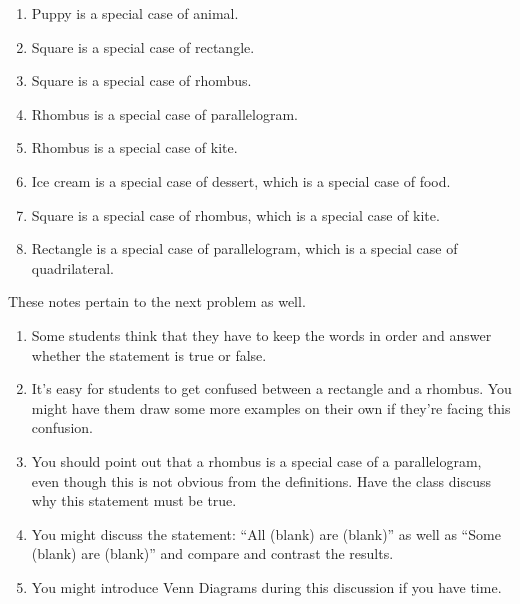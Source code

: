 \documentclass[handout]{ximera}
\begin{document}
\begin{problem}
\begin{solution}
\begin{enumerate}
\item Puppy is a special case of animal.
\item Square is a special case of rectangle.
\item Square is a special case of rhombus.
\item Rhombus is a special case of parallelogram.
\item Rhombus is a special case of kite.
\item Ice cream is a special case of dessert, which is a special case of food.
\item Square is a special case of rhombus, which is a special case of kite.
\item Rectangle is a special case of parallelogram, which is a special case of quadrilateral.
\end{enumerate}
\end{solution}

\begin{instructorNotes}
These notes pertain to the next problem as well.
\begin{enumerate}
\item Some students think that they have to keep the words in order and answer whether the statement is true or false.  
\item It's easy for students to get confused between a rectangle and a rhombus.  You might have them draw some more examples on their own if they're facing this confusion.
\item You should point out that a rhombus is a special case of a parallelogram, even though this is not obvious from the definitions.  Have the class discuss why this statement must be true.
\item You might discuss the statement: ``All (blank) are (blank)'' as well as ``Some (blank) are (blank)'' and compare and contrast the results.
\item You might introduce Venn Diagrams during this discussion if you have time.
\end{enumerate}
\end{instructorNotes}
\end{problem}
\end{document}
